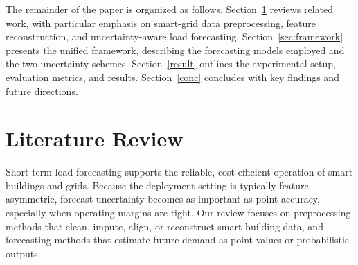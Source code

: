 \documentclass[final,10pt,1p,authoryear]{elsarticle}
\theoremstyle{definition}
\begin{document}
The remainder of the paper is organized as follows. Section~\ref{lit} reviews related work, with particular emphasis on smart-grid data preprocessing, feature reconstruction, and uncertainty-aware load forecasting. Section~\ref{sec:framework} presents the unified framework, describing the forecasting models employed and the two uncertainty schemes. Section~\ref{result} outlines the experimental setup, evaluation metrics, and results. Section~\ref{conc} concludes with key findings and future directions.

\section{Literature Review}\label{lit}
Short-term load forecasting supports the reliable, cost-efficient operation of smart buildings and grids. Because the deployment setting is typically feature-asymmetric, forecast uncertainty becomes as important as point accuracy, especially when operating margins are tight. Our review focuses on preprocessing methods that clean, impute, align, or reconstruct smart-building data, and forecasting methods that estimate future demand as point values or probabilistic outputs.
\end{document}
